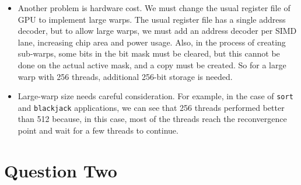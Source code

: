 \documentclass[12pt]{article}
\begin{document}
\begin{enumerate}[label=\alph*)]
\begin{itemize}
	\item Another problem is hardware cost. We must change the usual register file of GPU to implement large warps. The usual register file has a single address decoder, but to allow large warps, we must add an address decoder per SIMD lane, increasing chip area and power usage. Also, in the process of creating sub-warps, some bits in the bit mask must be cleared, but this cannot be done on the actual active mask, and a copy must be created. So for a large warp with 256 threads, additional 256-bit storage is needed.
	
	\item Large-warp size needs careful consideration. For example, in the case of \verb+sort+ and \verb+blackjack+ applications, we can see that 256 threads performed better than 512 because, in this case, most of the threads reach the reconvergence point and wait for a few threads to continue. 
\end{itemize}

\end{enumerate}

\newpage

\section{Question Two}
\end{document}
